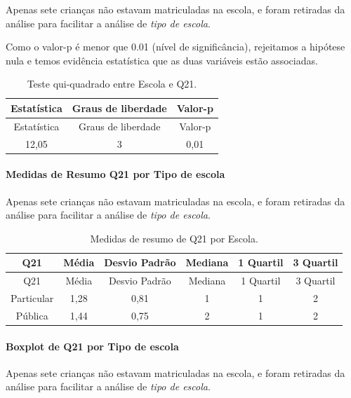 \documentclass[]{article}
\let\oldparagraph\paragraph
\renewcommand{\paragraph}[1]{\oldparagraph{#1}\mbox{}}
\begin{document}
Apenas sete crianças não estavam matriculadas na escola, e foram retiradas da análise para facilitar a análise de \emph{tipo de escola}.

Como o valor-p é menor que 0.01 (nível de significância), rejeitamos a hipótese nula e temos evidência estatística que as duas variáveis estão associadas.

\begin{longtable}[]{@{}ccc@{}}
\caption{\label{tab:unnamed-chunk-469}Teste qui-quadrado entre Escola e Q21.}\tabularnewline
\toprule
Estatística & Graus de liberdade & Valor-p\tabularnewline
\midrule
\endfirsthead
\toprule
Estatística & Graus de liberdade & Valor-p\tabularnewline
\midrule
\endhead
12,05 & 3 & 0,01\tabularnewline
\bottomrule
\end{longtable}

\cleardoublepage

\hypertarget{medidas-de-resumo-q21-por-tipo-de-escola}{%
\paragraph{Medidas de Resumo Q21 por Tipo de escola}\label{medidas-de-resumo-q21-por-tipo-de-escola}}

Apenas sete crianças não estavam matriculadas na escola, e foram retiradas da análise para facilitar a análise de \emph{tipo de escola}.

\begin{longtable}[]{@{}cccccc@{}}
\caption{\label{tab:unnamed-chunk-470}Medidas de resumo de Q21 por Escola.}\tabularnewline
\toprule
Q21 & Média & Desvio Padrão & Mediana & 1 Quartil & 3 Quartil\tabularnewline
\midrule
\endfirsthead
\toprule
Q21 & Média & Desvio Padrão & Mediana & 1 Quartil & 3 Quartil\tabularnewline
\midrule
\endhead
Particular & 1,28 & 0,81 & 1 & 1 & 2\tabularnewline
Pública & 1,44 & 0,75 & 2 & 1 & 2\tabularnewline
\bottomrule
\end{longtable}

\hypertarget{boxplot-de-q21-por-tipo-de-escola}{%
\paragraph{Boxplot de Q21 por Tipo de escola}\label{boxplot-de-q21-por-tipo-de-escola}}

Apenas sete crianças não estavam matriculadas na escola, e foram retiradas da análise para facilitar a análise de \emph{tipo de escola}.
\end{document}
